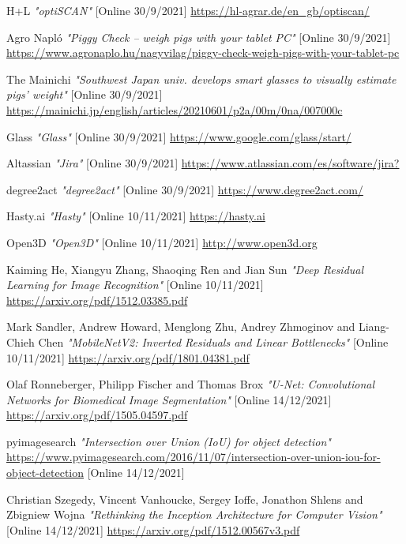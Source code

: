 \documentclass[12pt,a4paper]{article}
\begin{document}
\begin{thebibliography}{5}
    H+L \emph{"optiSCAN"} [Online 30/9/2021]
    \url{https://hl-agrar.de/en_gb/optiscan/}

    Agro Napló \emph{"Piggy Check – weigh pigs with your tablet PC"} [Online 30/9/2021]
    \url{https://www.agronaplo.hu/nagyvilag/piggy-check-weigh-pigs-with-your-tablet-pc}

    The Mainichi \emph{"Southwest Japan univ. develops smart glasses to visually estimate pigs' weight"} [Online 30/9/2021]
    \url{https://mainichi.jp/english/articles/20210601/p2a/00m/0na/007000c}

    Glass \emph{"Glass"} [Online 30/9/2021]
    \url{https://www.google.com/glass/start/}

    Altassian \emph{"Jira"} [Online 30/9/2021]
    \url{https://www.atlassian.com/es/software/jira?}

    degree2act \emph{"degree2act"} [Online 30/9/2021]
    \url{https://www.degree2act.com/}
    

    Hasty.ai \emph{"Hasty"} [Online 10/11/2021]
    \url{https://hasty.ai}



    Open3D \emph{"Open3D"} [Online 10/11/2021]
    \url{http://www.open3d.org}

    Kaiming He, Xiangyu Zhang, Shaoqing Ren and Jian Sun \emph{"Deep Residual Learning for Image Recognition"} [Online 10/11/2021]
    \url{https://arxiv.org/pdf/1512.03385.pdf}

    Mark Sandler, Andrew Howard, Menglong Zhu, Andrey Zhmoginov and Liang-Chieh Chen \emph{"MobileNetV2: Inverted Residuals and Linear Bottlenecks"} [Online 10/11/2021]
    \url{https://arxiv.org/pdf/1801.04381.pdf}

    Olaf Ronneberger, Philipp Fischer and Thomas Brox \emph{"U-Net: Convolutional Networks for Biomedical Image Segmentation"} [Online 14/12/2021]
    \url{https://arxiv.org/pdf/1505.04597.pdf}
    
   pyimagesearch \emph{"Intersection over Union (IoU) for object detection"} \url{https://www.pyimagesearch.com/2016/11/07/intersection-over-union-iou-for-object-detection}
    [Online 14/12/2021]
    
    Christian Szegedy, Vincent Vanhoucke, Sergey Ioffe, Jonathon Shlens and Zbigniew Wojna \emph{"Rethinking the Inception Architecture for Computer Vision"} [Online 14/12/2021]
    \url{https://arxiv.org/pdf/1512.00567v3.pdf}
    

\end{thebibliography}
\end{document}
